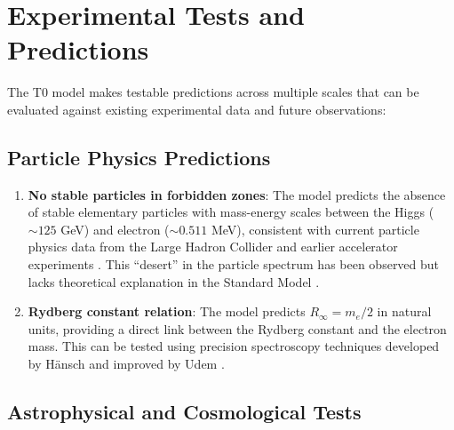 \documentclass[twocolumn,aps,prl]{revtex4-2}
\begin{document}
	\section{Experimental Tests and Predictions}
	\label{sec:outlook}
	
	The T0 model makes testable predictions across multiple scales that can be evaluated against existing experimental data and future observations:
	
	\subsection{Particle Physics Predictions}
	\label{subsec:particle_predictions}
	
	\begin{enumerate}
		\item \textbf{No stable particles in forbidden zones}: The model predicts the absence of stable elementary particles with mass-energy scales between the Higgs ($\sim 125$ GeV) and electron ($\sim 0.511$ MeV), consistent with current particle physics data from the Large Hadron Collider \cite{ATLAS2012} and earlier accelerator experiments \cite{CMS2012}. This “desert” in the particle spectrum has been observed but lacks theoretical explanation in the Standard Model \cite{Ellis1976}.
		\item \textbf{Rydberg constant relation}: The model predicts $R_\infty = m_e/2$ in natural units, providing a direct link between the Rydberg constant and the electron mass. This can be tested using precision spectroscopy techniques developed by Hänsch \cite{Hansch2006} and improved by Udem \cite{Udem2002}.
	\end{enumerate}
	
	\subsection{Astrophysical and Cosmological Tests}
	\label{subsec:astro_tests}
	
\end{document}
